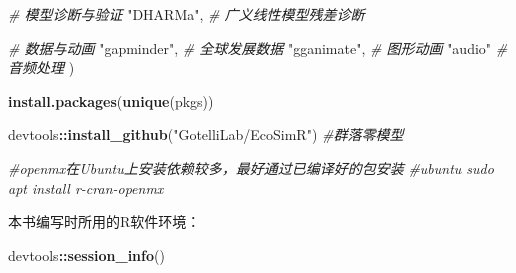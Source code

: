 \documentclass[
  twoside,12pt,fontset=none]{ctexbook}
\newenvironment{Shaded}{\begin{snugshade}}{\end{snugshade}}
\newcommand{\CommentTok}[1]{\textcolor[rgb]{0.56,0.35,0.01}{\textit{#1}}}
\newcommand{\FunctionTok}[1]{\textcolor[rgb]{0.13,0.29,0.53}{\textbf{#1}}}
\newcommand{\NormalTok}[1]{#1}
\newcommand{\SpecialCharTok}[1]{\textcolor[rgb]{0.81,0.36,0.00}{\textbf{#1}}}
\newcommand{\StringTok}[1]{\textcolor[rgb]{0.31,0.60,0.02}{#1}}
\begin{document}
\begin{Shaded}
\begin{Highlighting}[]
  \CommentTok{\# 模型诊断与验证}
  \StringTok{"DHARMa"}\NormalTok{,         }\CommentTok{\# 广义线性模型残差诊断}

  \CommentTok{\# 数据与动画}
  \StringTok{"gapminder"}\NormalTok{,      }\CommentTok{\# 全球发展数据}
  \StringTok{"gganimate"}\NormalTok{,      }\CommentTok{\# 图形动画}
  \StringTok{"audio"}           \CommentTok{\# 音频处理}
\NormalTok{)}

\FunctionTok{install.packages}\NormalTok{(}\FunctionTok{unique}\NormalTok{(pkgs))}

\NormalTok{devtools}\SpecialCharTok{::}\FunctionTok{install\_github}\NormalTok{(}\StringTok{"GotelliLab/EcoSimR"}\NormalTok{) }\CommentTok{\#群落零模型}

\CommentTok{\#openmx在Ubuntu上安装依赖较多，最好通过已编译好的包安装}
\CommentTok{\#ubuntu sudo apt install r{-}cran{-}openmx }
\end{Highlighting}
\end{Shaded}

本书编写时所用的R软件环境：

\begin{Shaded}
\begin{Highlighting}[]
\NormalTok{devtools}\SpecialCharTok{::}\FunctionTok{session\_info}\NormalTok{()}
\end{Highlighting}
\end{Shaded}
\end{document}
